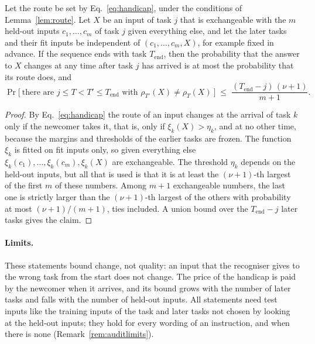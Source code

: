 \begin{theorem}
\label{thm:handicap}
Let the route be set by Eq.~\eqref{eq:handicap}, under the conditions of
Lemma~\ref{lem:route}. Let $X$ be an input of task $j$ that is exchangeable
with the $m$ held-out inputs $c_1, \dots, c_m$ of task $j$ given everything else, and let the
later tasks and their fit inputs be independent of $(c_1, \dots, c_m, X)$, for example fixed in
advance. If the sequence ends with task $T_{\mathrm{end}}$, then
the probability that the answer to $X$ changes at any time after task $j$ has arrived is at most
the probability that its route does, and
\[
  \Pr\bigl[\ \text{there are } j \le T < T' \le T_{\mathrm{end}} \text{ with } \rho_{T'}(X) \ne \rho_T(X) \ \bigr]
  \;\le\; \frac{(T_{\mathrm{end}} - j)\,(\nu+1)}{m+1} .
\]
\end{theorem}

\begin{proof}
By Eq.~\eqref{eq:handicap} the route of an input changes at the arrival of task $k$ only if the
newcomer takes it, that is, only if $\xi_k(X) > \eta_k$, and at no other time, because
the margins and thresholds of the earlier tasks are frozen. The function $\xi_k$ is fitted on fit
inputs only, so given everything else $\xi_k(c_1), \dots, \xi_k(c_m), \xi_k(X)$ are exchangeable. The threshold $\eta_k$ depends on the
held-out inputs, but all that is used is that it is at least the $(\nu+1)$-th largest of the
first $m$ of these numbers. Among $m + 1$ exchangeable numbers, the last one is strictly larger
than the $(\nu+1)$-th largest of the others with probability at most $(\nu+1)/(m+1)$, ties
included. A union bound over the $T_{\mathrm{end}} - j$ later tasks gives the claim.
\end{proof}

\paragraph{Limits.} These statements bound change, not quality: an input that the recogniser gives to the wrong task from the start does not change. The price of the handicap is paid by the newcomer when it arrives, and its bound grows with the number of later tasks and falls with the number of held-out inputs. All statements need test inputs like the training inputs of the task and later tasks not chosen by looking at the held-out inputs; they hold for every wording of an instruction, and when there is none (Remark~\ref{rem:auditlimits}).

